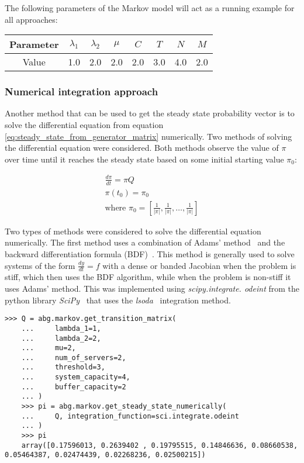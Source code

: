 The following parameters of the Markov model will act as a running example for
all approaches:

\begin{center}
    \begin{tabular}{|c|c|c|c|c|c|c|c|}
        \hline
        Parameter & \(\lambda_1\) & \(\lambda_2\) & \(\mu\) & \(C\) & \(T\)
        & \(N\) & \(M\) \\
        \hline
        Value & 1.0 & 2.0 & 2.0 & 2.0 & 3.0 & 4.0 & 2.0 \\
        \hline
    \end{tabular}
\end{center}


\subsubsection{Numerical integration approach}

Another method that can be used to get the steady state probability vector is
to solve the differential equation from equation
\ref{eq:steady_state_from_generator_matrix} numerically.
Two methods of solving the differential equation were considered.
Both methods observe the value of \(\pi\) over time until it
reaches the steady state based on some initial starting value \(\pi_0\):

\begin{gather}
    \frac{d\pi}{dt} = \pi Q \\
    \pi(t_0) = \pi_0 \nonumber \\
    \text{where } \pi_0 =
    [\frac{1}{|\pi|}, \frac{1}{|\pi|}, \dots, \frac{1}{|\pi|}] \nonumber
\end{gather}

Two types of methods were considered to solve the differential equation
numerically.
The first method uses a combination of Adams' method~\cite{adams_method} and the
backward differentiation formula (BDF)~\cite{backward_differentiation_formula}.
This method is generally used to solve systems of the form
\(\frac{dy}{dt} = f\) with a dense or banded Jacobian when the problem is stiff,
which then uses the BDF algorithm, while when the problem is non-stiff it uses
Adams' method.
This was implemented using \textit{scipy.integrate. odeint} from the python
library \textit{SciPy}~\cite{2020SciPy-NMeth} that uses the
\textit{lsoda}~\cite{lsoda_algorithm} integration method.

\begin{lstlisting}[style=pystyle]
    >>> Q = abg.markov.get_transition_matrix(
    ...     lambda_1=1,
    ...     lambda_2=2,
    ...     mu=2,
    ...     num_of_servers=2,
    ...     threshold=3,
    ...     system_capacity=4,
    ...     buffer_capacity=2
    ... )
    >>> pi = abg.markov.get_steady_state_numerically(
    ...     Q, integration_function=sci.integrate.odeint
    ... )
    >>> pi
    array([0.17596013, 0.2639402 , 0.19795515, 0.14846636, 0.08660538, 0.05464387, 0.02474439, 0.02268236, 0.02500215])

\end{lstlisting}


